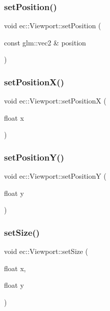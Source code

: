 \subsubsection{\texorpdfstring{set\+Position()}{setPosition()}\hspace{0.1cm}{\footnotesize\ttfamily [2/2]}}
{\footnotesize\ttfamily void ec\+::\+Viewport\+::set\+Position (\begin{DoxyParamCaption}\item[{const glm\+::vec2 \&}]{position }\end{DoxyParamCaption})}

\mbox{\label{classec_1_1_viewport_a2fd67017414985517470b75afb3402a7}} 
\subsubsection{\texorpdfstring{set\+Position\+X()}{setPositionX()}}
{\footnotesize\ttfamily void ec\+::\+Viewport\+::set\+PositionX (\begin{DoxyParamCaption}\item[{float}]{x }\end{DoxyParamCaption})}

\mbox{\label{classec_1_1_viewport_a754e8f6f4b857c70b598dc3bf5a7badd}} 
\subsubsection{\texorpdfstring{set\+Position\+Y()}{setPositionY()}}
{\footnotesize\ttfamily void ec\+::\+Viewport\+::set\+PositionY (\begin{DoxyParamCaption}\item[{float}]{y }\end{DoxyParamCaption})}

\mbox{\label{classec_1_1_viewport_a72cca5d2d2eb6fee38a28c27ffc8b395}} 
\subsubsection{\texorpdfstring{set\+Size()}{setSize()}\hspace{0.1cm}{\footnotesize\ttfamily [1/2]}}
{\footnotesize\ttfamily void ec\+::\+Viewport\+::set\+Size (\begin{DoxyParamCaption}\item[{float}]{x,  }\item[{float}]{y }\end{DoxyParamCaption})}

